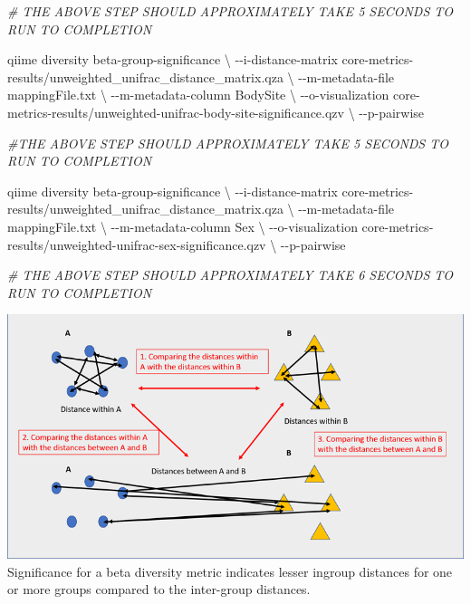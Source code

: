 \documentclass[
]{book}
\newenvironment{Shaded}{\begin{snugshade}}{\end{snugshade}}
\newcommand{\CommentTok}[1]{\textcolor[rgb]{0.56,0.35,0.01}{\textit{#1}}}
\newcommand{\DataTypeTok}[1]{\textcolor[rgb]{0.13,0.29,0.53}{#1}}
\newcommand{\ExtensionTok}[1]{#1}
\newcommand{\NormalTok}[1]{#1}
\begin{document}
\begin{Shaded}
\begin{Highlighting}[]
\CommentTok{\# THE ABOVE STEP SHOULD APPROXIMATELY TAKE 5 SECONDS TO RUN TO COMPLETION}

\ExtensionTok{qiime}\NormalTok{ diversity beta{-}group{-}significance }\DataTypeTok{\textbackslash{}}
\NormalTok{{-}{-}i{-}distance{-}matrix core{-}metrics{-}results/unweighted\_unifrac\_distance\_matrix.qza }\DataTypeTok{\textbackslash{}}
\NormalTok{{-}{-}m{-}metadata{-}file mappingFile.txt }\DataTypeTok{\textbackslash{}}
\NormalTok{{-}{-}m{-}metadata{-}column BodySite }\DataTypeTok{\textbackslash{}}
\NormalTok{{-}{-}o{-}visualization core{-}metrics{-}results/unweighted{-}unifrac{-}body{-}site{-}significance.qzv }\DataTypeTok{\textbackslash{}}
\NormalTok{{-}{-}p{-}pairwise}

\CommentTok{\#THE ABOVE STEP SHOULD APPROXIMATELY TAKE 5 SECONDS TO RUN TO COMPLETION}

\ExtensionTok{qiime}\NormalTok{ diversity beta{-}group{-}significance }\DataTypeTok{\textbackslash{}}
\NormalTok{{-}{-}i{-}distance{-}matrix core{-}metrics{-}results/unweighted\_unifrac\_distance\_matrix.qza }\DataTypeTok{\textbackslash{}}
\NormalTok{{-}{-}m{-}metadata{-}file mappingFile.txt }\DataTypeTok{\textbackslash{}}
\NormalTok{{-}{-}m{-}metadata{-}column Sex }\DataTypeTok{\textbackslash{}}
\NormalTok{{-}{-}o{-}visualization core{-}metrics{-}results/unweighted{-}unifrac{-}sex{-}significance.qzv }\DataTypeTok{\textbackslash{}}
\NormalTok{{-}{-}p{-}pairwise}

\CommentTok{\# THE ABOVE STEP SHOULD APPROXIMATELY TAKE 6 SECONDS TO RUN TO COMPLETION}
\end{Highlighting}
\end{Shaded}

\includegraphics[width=1\textwidth,height=\textheight]{./QIIMEpics/beta_diversity.png}
Significance for a beta diversity metric indicates lesser ingroup distances for one or more groups compared to the inter-group distances.
\end{document}

